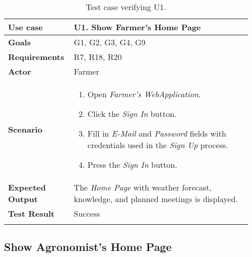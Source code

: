 \begin{longtable}{@{}p{0.25\linewidth}p{0.71\linewidth}@{}}
	\toprule
	\textbf{Use case} & \textbf{U1.} Show Farmer's Home Page\\
	\midrule
	\textbf{Goals} & G1, G2, G3, G4, G9\\
	\midrule
	\textbf{Requirements} & R7, R18, R20\\
	\midrule
	\textbf{Actor} & Farmer\\
	\midrule
	\textbf{Scenario} & 
	\begin{enumerate}[leftmargin=.4cm,noitemsep,topsep=0pt,before=\vspace{-3mm},after=\vspace{-4mm}]
		\item Open \textit{Farmer's WebApplication}.
		\item Click the \textit{Sign In} button.
		\item Fill in \textit{E-Mail} and \textit{Password} fields with credentials used in the \textit{Sign Up} process.
		\item Press the \textit{Sign In} button.
	\end{enumerate}\\
	\midrule
	\textbf{Expected Output} & The \textit{Home Page} with weather forecast, knowledge, and planned meetings is displayed.\\
	\midrule
	\textbf{Test Result} & Success\\
	\bottomrule
	\caption{Test case verifying U1.}
\end{longtable}

\subsection{Show Agronomist's Home Page}


